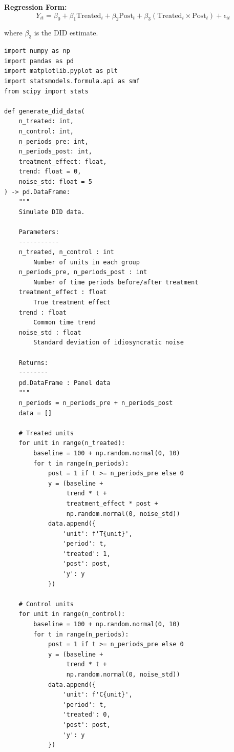 \textbf{Regression Form:}
\begin{equation}
Y_{it} = \beta_0 + \beta_1 \text{Treated}_i + \beta_2 \text{Post}_t + \beta_3 (\text{Treated}_i \times \text{Post}_t) + \epsilon_{it}
\end{equation}

where $\beta_3$ is the DID estimate.

\lstset{language=Python, caption=Difference-in-Differences Analysis}
\begin{lstlisting}
import numpy as np
import pandas as pd
import matplotlib.pyplot as plt
import statsmodels.formula.api as smf
from scipy import stats

def generate_did_data(
    n_treated: int,
    n_control: int,
    n_periods_pre: int,
    n_periods_post: int,
    treatment_effect: float,
    trend: float = 0,
    noise_std: float = 5
) -> pd.DataFrame:
    """
    Simulate DID data.

    Parameters:
    -----------
    n_treated, n_control : int
        Number of units in each group
    n_periods_pre, n_periods_post : int
        Number of time periods before/after treatment
    treatment_effect : float
        True treatment effect
    trend : float
        Common time trend
    noise_std : float
        Standard deviation of idiosyncratic noise

    Returns:
    --------
    pd.DataFrame : Panel data
    """
    n_periods = n_periods_pre + n_periods_post
    data = []

    # Treated units
    for unit in range(n_treated):
        baseline = 100 + np.random.normal(0, 10)
        for t in range(n_periods):
            post = 1 if t >= n_periods_pre else 0
            y = (baseline +
                 trend * t +
                 treatment_effect * post +
                 np.random.normal(0, noise_std))
            data.append({
                'unit': f'T{unit}',
                'period': t,
                'treated': 1,
                'post': post,
                'y': y
            })

    # Control units
    for unit in range(n_control):
        baseline = 100 + np.random.normal(0, 10)
        for t in range(n_periods):
            post = 1 if t >= n_periods_pre else 0
            y = (baseline +
                 trend * t +
                 np.random.normal(0, noise_std))
            data.append({
                'unit': f'C{unit}',
                'period': t,
                'treated': 0,
                'post': post,
                'y': y
            })


\end{lstlisting}
